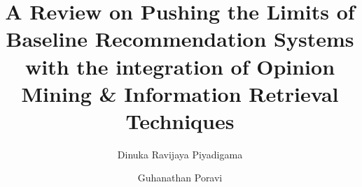\documentclass[manuscript,screen,natbib=false]{acmart}
\begin{document}
\title{A Review on Pushing the Limits of Baseline Recommendation Systems with the integration of Opinion Mining \& Information Retrieval Techniques}

\author{Dinuka Ravijaya Piyadigama}

\author{Guhanathan Poravi}

\end{document}
